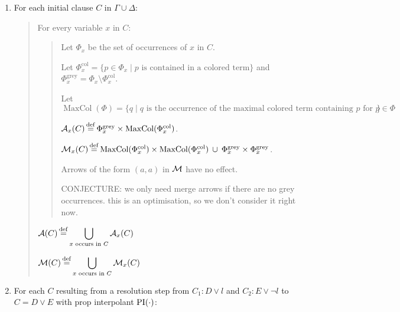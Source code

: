 \documentclass[,%
	paper=a4,%
	DIV12, %
	twoside=false,%
	liststotoc,
	bibtotoc,
	draft=false,%
	numbers=noendperiod
]{scrartcl}
\begin{document}
\newcommand{\Phicol}{\Phi^{\operatorname{col}}}
\newcommand{\Phigrey}{\Phi^{\operatorname{grey}}}
\newcommand{\MaxCol}{\operatorname{MaxCol}}
\begin{enumerate}
	\item For each initial clause $C$ in $\Gamma \cup \Delta$:

		\begin{quote}
			For every variable $x$ in $C$:

			\begin{quote}

				Let $\Phi_x$ be the set of occurrences of $x$ in $C$. 

				Let $\Phicol_x = \{p \in \Phi_x \mid \text{$p$ is contained in a colored term} \}$
				and $\Phigrey_x = \Phi_x \setminus \Phicol_x$.

				Let $\MaxCol(\Phi) = \{q \mid \text{$q$ is the occurrence of the maximal colored term containing $p$ for $p \in \Phi$} \}$

				$\arr_x(C) \defeq \Phigrey_x \times \MaxCol(\Phicol_x)$. 


				$\warr_x(C) \defeq \MaxCol(\Phicol_x) \times \MaxCol(\Phicol_x) \spam\cup
				\Phigrey_x\times\Phigrey_x$. 

				Arrows of the form $(a, a)$ in $\operatorname{\operatorname{\mathcal{M}}}$ have no effect.

				CONJECTURE: we only need merge arrows if  there are no grey occurrences. this is an optimisation, so we don't consider it right now.
			\end{quote}

			$\operatorname{\mathcal{A}}(C) \operatorname{\stackrel{\mathrm{def}}{=}}\displaystyle \bigcup_{ x \text{ occurs in }C} \operatorname{\mathcal{A}}_x(C)$

			$\operatorname{\operatorname{\mathcal{M}}}(C) \operatorname{\stackrel{\mathrm{def}}{=}}\displaystyle \bigcup_{x \text{ occurs in }C} \operatorname{\operatorname{\mathcal{M}}}_x(C)$
		\end{quote}



	\item 
		For each $C$ resulting from a resolution step from $C_1: D\lor l$ and $C_2: E\lor \lnot l$ to $C = D \lor E$ with prop interpolant $\operatorname{PI}(\cdot)$:


\end{enumerate}
\end{document}
